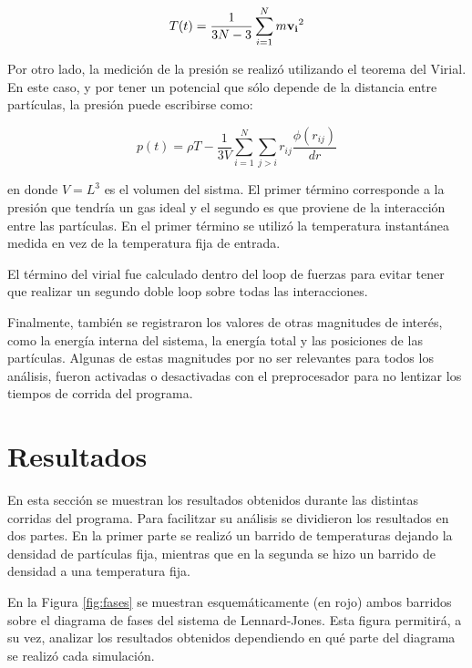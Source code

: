 \documentclass[a4paper,12pt]{article}
\begin{document}
\begin{equation}\label{eq:tempe}
 T(t) = \frac{1}{3N-3} \sum_{i=1}^{N} m {\bf v_i}^2
\end{equation}

Por otro lado, la medición de la presión se realizó utilizando el teorema del 
Virial. En este caso, y por tener un potencial que sólo depende de la distancia 
entre partículas, la presión puede escribirse como:

\begin{equation}\label{eq:pres}
p(t) = \rho T  - \frac{1}{3V} \sum_{i=1}^N \sum_{j>i} r_{ij} \frac{\phi(r_{ij})}{dr}
\end{equation}

\noindent en donde $V=L^3$ es el volumen del sistma. El primer término 
corresponde a la presión que tendría un gas ideal y el segundo es que proviene 
de la interacción entre las partículas. En el primer término se utilizó la 
temperatura instantánea medida en vez de la temperatura fija de entrada.

El término del virial fue calculado dentro del loop de fuerzas para evitar 
tener que realizar un segundo doble loop sobre todas las interacciones.

Finalmente, también se registraron los valores de otras magnitudes de interés, 
como la energía interna del sistema, la energía total y las posiciones de las 
partículas. Algunas de estas magnitudes por no ser relevantes para todos los 
análisis, fueron activadas o desactivadas con el preprocesador para no lentizar 
los tiempos de corrida del programa.



\section{Resultados}

En esta sección se muestran los resultados obtenidos durante las distintas 
corridas del programa. Para facilitzar su análisis se dividieron los resultados 
en dos partes. En la primer parte se realizó un barrido de temperaturas 
dejando la densidad de partículas fija, mientras que en la segunda se hizo un 
barrido de densidad a una temperatura fija.

En la Figura \eqref{fig:fases} se muestran esquemáticamente (en rojo) ambos 
barridos sobre el diagrama de fases del sistema de Lennard-Jones. Esta figura 
permitirá, a su vez, analizar los resultados obtenidos dependiendo en qué parte 
del diagrama se realizó cada simulación.
\end{document}
